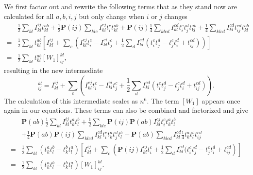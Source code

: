 \documentclass[a4paper,norsk,11pt,twoside]{report}
\begin{document}
We first factor out and rewrite the following terms that as they stand now are calculated for all $a,b,i,j$ but only change when $i$ or $j$ changes
\begin{align}
& 
\frac{1}{2} \sum_{kl} I_{kl}^{ij} t_{kl}^{ab} + \frac{1}{2} \textbf{P}(ij) \sum_{klc} I_{kl}^{cj} t_i^c t_{kl}^{ab} + \textbf{P}(ij) \frac{1}{4} \sum_{klcd} I_{kl}^{cd}  t_i^c t_j^d t_{kl}^{ab}
+ \frac{1}{4} \sum_{klcd} I_{kl}^{cd} t_{ij}^{cd} t_{kl}^{ab}
\nonumber \\ 
= &
\frac{1}{2} \sum_{kl} t_{kl}^{ab} \left[ I_{kl}^{ij} +  \sum_c \left(I_{kl}^{cj} t_i^c - I_{kl}^{ci} t_j^c + \frac{1}{2} \sum_{d}  I_{kl}^{cd} (t_i^c t_j^d - t_j^c t_i^d + t_{ij}^{cd})
 \right) \right]
\nonumber \\ 
= & \frac{1}{2} \sum_{kl} t_{kl}^{ab} [W_1]_{ij}^{kl} ,
\end{align}
resulting in the new intermediate
\begin{equation}
[W_1]^{kl}_{ij} = I_{kl}^{ij} +  \sum_c \left(I_{kl}^{cj} t_i^c - I_{kl}^{ci} t_j^c + \frac{1}{2} \sum_{d}  I_{kl}^{cd} (t_i^c t_j^d - t_j^c t_i^d + t_{ij}^{cd})
 \right) . \label{intermedw1}
\end{equation}
The calculation of this intermediate scales as $n^6$. The term $[W_1]$
appears once again in our equations. These terms can also be combined
and factorized and give
\begin{align}
& \textbf{P}(ab) \frac{1}{2} \sum_{kl} I_{kl}^{ij} t_k^a t_l^b
+ \frac{1}{2} \sum_{klc} \textbf{P}(ij) \textbf{P}(ab) I_{kl}^{cj} t_i^c t_k^a t_l^b 
\nonumber \\ &
+ \frac{1}{4} \textbf{P}(ab) \textbf{P}(ij) \sum_{klcd} I_{kl}^{cd} t_i^c t_k^a t_j^d t_l^b
+ \textbf{P}(ab) \sum_{klcd} I_{kl}^{cd} \frac{1}{4} t_k^a t_l^b t_{ij}^{cd}
\nonumber \\ 
= &
\frac{1}{2} \sum_{kl} (t_k^a t_l^b - t_k^b t_l^a) \left[ I_{kl}^{ij} + \sum_c \left( \textbf{P}(ij) I_{kl}^{cj} t_i^c +
\frac{1}{2} \sum_d I_{kl}^{cd} ( t_i^c t_j^d - t_j^c t_i^d + t_{ij}^{cd}
\right) \right] \nonumber \\ 
= &
\frac{1}{2} \sum_{kl} (t_k^a t_l^b - t_k^b t_l^a) [W_1]_{ij}^{kl} .
\end{align}
\end{document}
